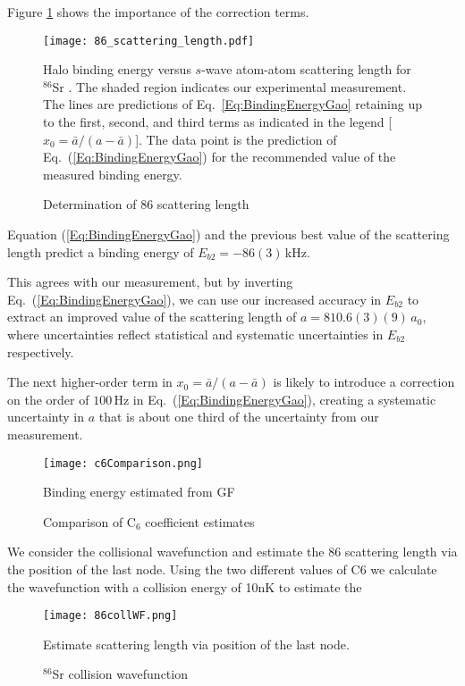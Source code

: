 Figure \ref{Fig:HaloBindingEnergy} shows the importance of the correction terms.

	\begin{figure} 
	\centerline{
	  \texttt{[image: 86\_scattering\_length.pdf]}}
	  \caption{Determination of 86 scattering length}{Halo binding energy versus $s$-wave atom-atom scattering length for $^{86}$Sr . The shaded region indicates our experimental measurement. The lines are predictions of Eq.\ \ref{Eq:BindingEnergyGao} retaining up to the first, second, and third terms as indicated in the legend [$x_0={\bar{a}}/({a-\bar{a}})$]. The data point is the prediction of Eq.\ (\ref{Eq:BindingEnergyGao}) for the recommended value of the measured binding energy.}
	  \label{Fig:HaloBindingEnergy}
	\end{figure}

Equation (\ref{Eq:BindingEnergyGao}) and the previous best value of the scattering length \cite{skt10} predict a binding energy of $E_{b2}=-86(3)$\,kHz.

This agrees with our measurement, but by inverting Eq.\ (\ref{Eq:BindingEnergyGao}), we can use our increased accuracy in $E_{b2}$ to extract an improved value of the scattering length of $a=810.6(3)(9)$\,$a_0$, where uncertainties reflect statistical and systematic uncertainties in $E_{b2}$ respectively.

The next higher-order term in $x_0={\bar{a}}/({a-\bar{a}})$ is likely to introduce a correction on the order of $100$\,Hz in Eq.\ (\ref{Eq:BindingEnergyGao}), creating a systematic uncertainty in $a$ that is about one third of the uncertainty from our measurement.

	\begin{figure} 
	\centerline{
	  \texttt{[image: c6Comparison.png]}}
	  \caption{Comparison of C$_6$ coefficient estimates}{Binding energy estimated from GF}
	  \label{fig:c6estimates}
	\end{figure}
	

We consider the collisional wavefunction and estimate the 86 scattering length via the position of the last node.
Using the two different values of C6 we calculate the wavefunction with a collision energy of 10nK to estimate the 
	\begin{figure} 
	\centerline{
	  \texttt{[image: 86collWF.png]}}
	  \caption{$^{86}$Sr collision wavefunction}{Estimate scattering length via position of the last node.}
	  \label{fig:86CollWF}
	\end{figure}

